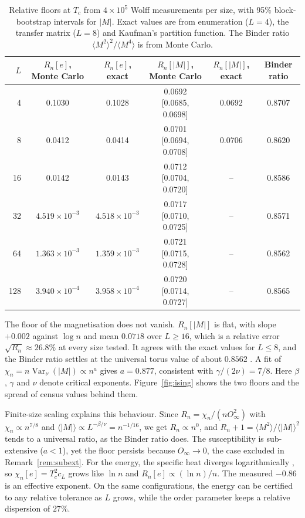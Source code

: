 \documentclass[ba,preprint]{imsart}
\theoremstyle{plain}
\theoremstyle{definition}
\newcommand{\Var}{\operatorname{Var}}
\begin{document}
\begin{table}[t]
\centering
\caption{Relative floors at $T_c$ from $4\times10^5$ Wolff measurements per size, with 95\% block-bootstrap intervals for $|M|$. Exact values are from enumeration ($L=4$), the transfer matrix ($L=8$) and Kaufman's partition function. The Binder ratio $\langle M^2\rangle^2/\langle M^4\rangle$ is from Monte Carlo.}
\label{tab:ising}
\footnotesize
\setlength{\tabcolsep}{3pt}
\begin{tabular}{rccccc}
\toprule
$L$ & $R_n[e]$, Monte Carlo & $R_n[e]$, exact & $R_n[|M|]$, Monte Carlo & $R_n[|M|]$, exact & Binder ratio\\
\midrule
4   & 0.1030 & 0.1028 & 0.0692 [0.0685, 0.0698] & 0.0692 & 0.8707\\
8   & 0.0412 & 0.0414 & 0.0701 [0.0694, 0.0708] & 0.0706 & 0.8620\\
16  & 0.0142 & 0.0143 & 0.0712 [0.0704, 0.0720] & -- & 0.8586\\
32  & $4.519\times10^{-3}$ & $4.518\times10^{-3}$ & 0.0717 [0.0710, 0.0725] & -- & 0.8571\\
64  & $1.363\times10^{-3}$ & $1.359\times10^{-3}$ & 0.0721 [0.0715, 0.0728] & -- & 0.8562\\
128 & $3.940\times10^{-4}$ & $3.958\times10^{-4}$ & 0.0720 [0.0714, 0.0727] & -- & 0.8565\\
\bottomrule
\end{tabular}
\end{table}

The floor of the magnetisation does not vanish. $R_n[|M|]$ is flat, with slope $+0.002$ against $\log n$ and mean $0.0718$ over $L\ge16$, which is a relative error $\sqrt{R_n}\approx26.8\%$ at every size tested. It agrees with the exact values for $L\le8$, and the Binder ratio settles at the universal torus value of about $0.8562$ \citep{SalasSokal2000}. A fit of $\chi_n=n\Var_\nu(|M|)\propto n^a$ gives $a=0.877$, consistent with $\gamma/(2\nu)=7/8$. Here $\beta$, $\gamma$ and $\nu$ denote critical exponents. Figure~\ref{fig:ising} shows the two floors and the spread of census values behind them.

Finite-size scaling explains this behaviour. Since $R_n=\chi_n/(nO_\infty^2)$ with $\chi_n\propto n^{7/8}$ and $\langle|M|\rangle\propto L^{-\beta/\nu}=n^{-1/16}$, we get $R_n\propto n^0$, and $R_n+1=\langle M^2\rangle/\langle|M|\rangle^2$ tends to a universal ratio, as the Binder ratio does. The susceptibility is sub-extensive ($a<1$), yet the floor persists because $O_\infty\to0$, the case excluded in Remark~\ref{rem:subext}. For the energy, the specific heat diverges logarithmically \citep{FerdinandFisher1969,Onsager1944}, so $\chi_n[e]=T_c^2c_L$ grows like $\ln n$ and $R_n[e]\propto(\ln n)/n$. The measured $-0.86$ is an effective exponent. On the same configurations, the energy can be certified to any relative tolerance as $L$ grows, while the order parameter keeps a relative dispersion of $27\%$.
\end{document}
